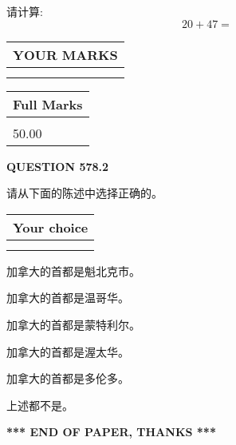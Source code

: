 \documentclass{ctexart}
\begin{document}
  
 
请计算:
\begin{equation}
20 +  %
47 = \nonumber
\end{equation}
 

 

 
  
\vspace{0.2in}
  
\noindent\begin{tabular}{|l|}
\hline
 YOUR MARKS  \\
\hline
 \\ 
 \\ 
\hline
\end{tabular}
\hspace{0.05in} \begin{tabular}{|l|}
\hline
 Full Marks  \\
\hline
 \\ 
50.00 \\
\hline
\end{tabular}
{\textbf{\Large{QUESTION
578.2 
}}}
  
  
请从下面的陈述中选择正确的。
  
  
\noindent\hspace{3.0in} \begin{tabular}{|l|}
\hline
Your choice \\
\hline
 \\ 
 \\ 
\hline
\end{tabular}
  
  
 
 
加拿大的首都是魁北克市。
 
 
加拿大的首都是温哥华。
 
 
加拿大的首都是蒙特利尔。
 
 
加拿大的首都是渥太华。
 
 
加拿大的首都是多伦多。
 
 
 上述都不是。
 
 
   
   
 \vspace{0.2in}
 
   
   
   
   
\vspace{1.0in} 
{\textbf{\large{ *** END OF PAPER, THANKS *** }}} 
   
\end{document}
